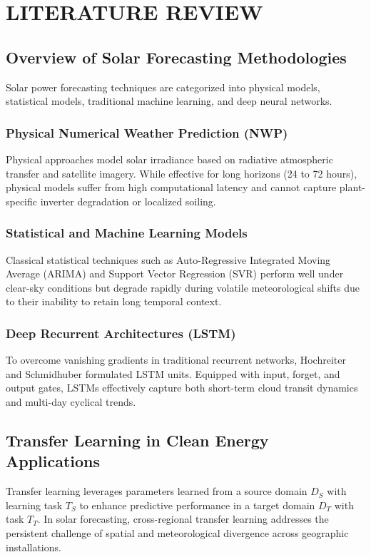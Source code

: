\documentclass[12pt,a4paper,oneside]{report}
\begin{document}
\newpage
\chapter{LITERATURE REVIEW}

\section{Overview of Solar Forecasting Methodologies}
Solar power forecasting techniques are categorized into physical models, statistical models, traditional machine learning, and deep neural networks.

\subsection{Physical Numerical Weather Prediction (NWP)}
Physical approaches model solar irradiance based on radiative atmospheric transfer and satellite imagery. While effective for long horizons (24 to 72 hours), physical models suffer from high computational latency and cannot capture plant-specific inverter degradation or localized soiling.

\subsection{Statistical and Machine Learning Models}
Classical statistical techniques such as Auto-Regressive Integrated Moving Average (ARIMA) and Support Vector Regression (SVR) perform well under clear-sky conditions but degrade rapidly during volatile meteorological shifts due to their inability to retain long temporal context.

\subsection{Deep Recurrent Architectures (LSTM)}
To overcome vanishing gradients in traditional recurrent networks, Hochreiter and Schmidhuber formulated LSTM units. Equipped with input, forget, and output gates, LSTMs effectively capture both short-term cloud transit dynamics and multi-day cyclical trends.

\section{Transfer Learning in Clean Energy Applications}
Transfer learning leverages parameters learned from a source domain $D_S$ with learning task $T_S$ to enhance predictive performance in a target domain $D_T$ with task $T_T$. In solar forecasting, cross-regional transfer learning addresses the persistent challenge of spatial and meteorological divergence across geographic installations.
\end{document}
